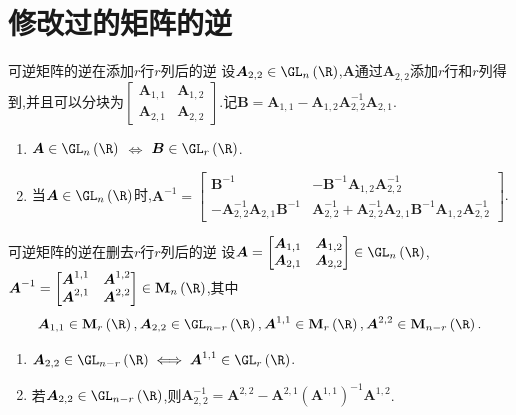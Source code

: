 \section{修改过的矩阵的逆}

\begin{theorem}{可逆矩阵的逆在添加$r$行$r$列后的逆}{}
	设$\boldsymbol{A}_{2,2}\in\GL_{n}\left(\R\right)$,$\boldsymbol{A}$通过$\boldsymbol{A}_{2,2}$添加$r$行和$r$列得到,并且可以分块为$
	\begin{bmatrix}
		\boldsymbol{A}_{1,1}&\boldsymbol{A}_{1,2}\\
		\boldsymbol{A}_{2,1}&\boldsymbol{A}_{2,2}
	\end{bmatrix}$.记$\boldsymbol{B}=\boldsymbol{A}_{1,1}-\boldsymbol{A}_{1,2}\boldsymbol{A}_{2,2}^{-1}\boldsymbol{A}_{2,1}$.
	\begin{enumerate}
		\item $\boldsymbol{A}\in\GL_{n}\left(\R\right)$ $\iff$ $\boldsymbol{B}\in\GL_{r}\left(\R\right)$.
		\item 当$\boldsymbol{A}\in\GL_{n}\left(\R\right)$时,$\boldsymbol{A}^{-1}=
		\begin{bmatrix}
			\boldsymbol{B}^{-1}&-\boldsymbol{B}^{-1}\boldsymbol{A}_{1,2}\boldsymbol{A}_{2,2}^{-1}\\
			-\boldsymbol{A}_{2,2}^{-1}\boldsymbol{A}_{2,1}\boldsymbol{B}^{-1}&\boldsymbol{A}_{2,2}^{-1}+\boldsymbol{A}_{2,2}^{-1}\boldsymbol{A}_{2,1}\boldsymbol{B}^{-1}\boldsymbol{A}_{1,2}\boldsymbol{A}_{2,2}^{-1}	
		\end{bmatrix}$.
	\end{enumerate}
\end{theorem}

\begin{theorem}{可逆矩阵的逆在删去$r$行$r$列后的逆}{}
	设$\boldsymbol{A}=\begin{bmatrix}
		\boldsymbol{A}_{1,1}&\boldsymbol{A}_{1,2}\\
		\boldsymbol{A}_{2,1}&\boldsymbol{A}_{2,2}
	\end{bmatrix}\in\GL_{n}\left(\R\right)$,$\boldsymbol{A}^{-1}=
	\begin{bmatrix}
		\boldsymbol{A}^{1,1}&\boldsymbol{A}^{1,2}\\
		\boldsymbol{A}^{2,1}&\boldsymbol{A}^{2,2}
	\end{bmatrix}\in\mathbf{M}_{n}\left(\R\right)$,其中
	\begin{align*}
		\boldsymbol{A}_{1,1}\in\mathbf{M}_{r}\left(\boldsymbol{\R}\right),\boldsymbol{A}_{2,2}\in\GL_{n-r}\left(\R\right),\boldsymbol{A}^{1,1}\in\mathbf{M}_{r}\left(\R\right),\boldsymbol{A}^{2,2}\in\mathbf{M}_{n-r}\left(\R\right).
	\end{align*}
	\begin{enumerate}
		\item $\boldsymbol{A}_{2,2}\in\GL_{n-r}\left(\R\right)\iff\boldsymbol{A}^{1,1}\in\GL_{r}\left(\R\right)$.
		\item 若$\boldsymbol{A}_{2,2}\in\GL_{n-r}\left(\R\right)$,则$\boldsymbol{A}_{2,2}^{-1}=\boldsymbol{A}^{2,2}-\boldsymbol{A}^{2,1}\left(\boldsymbol{A}^{1,1}\right)^{-1}\boldsymbol{A}^{1,2}$.
	\end{enumerate}
\end{theorem}

